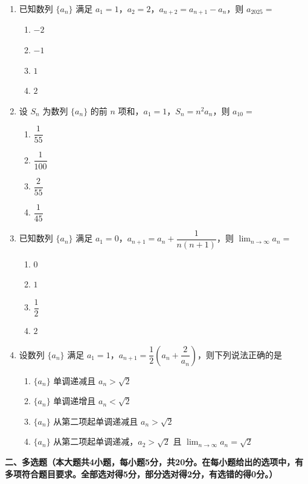 \documentclass[12pt, a4paper]{ctexart}
\newcommand{\score}[1]{\hfill\makebox[2cm][l]{(#1分)}}
\begin{document}
\begin{enumerate}
\item 已知数列 $\{a_n\}$ 满足 $a_1 = 1$，$a_2 = 2$，$a_{n+2} = a_{n+1} - a_n$，则 $a_{2025} = $\score{5}
\begin{enumerate}[label=\Alph*.]
\item $-2$
\item $-1$
\item $1$
\item $2$
\end{enumerate}

\item 设 $S_n$ 为数列 $\{a_n\}$ 的前 $n$ 项和，$a_1 = 1$，$S_n = n^2 a_n$，则 $a_{10} = $\score{5}
\begin{enumerate}[label=\Alph*.]
\item $\dfrac{1}{55}$
\item $\dfrac{1}{100}$
\item $\dfrac{2}{55}$
\item $\dfrac{1}{45}$
\end{enumerate}

\item 已知数列 $\{a_n\}$ 满足 $a_1 = 0$，$a_{n+1} = a_n + \dfrac{1}{n(n+1)}$，则 $\displaystyle\lim_{n \to \infty} a_n = $\score{5}
\begin{enumerate}[label=\Alph*.]
\item $0$
\item $1$
\item $\dfrac{1}{2}$
\item $2$
\end{enumerate}

\item 设数列 $\{a_n\}$ 满足 $a_1 = 1$，$a_{n+1} = \dfrac{1}{2}\left(a_n + \dfrac{2}{a_n}\right)$，则下列说法正确的是\score{5}
\begin{enumerate}[label=\Alph*.]
\item $\{a_n\}$ 单调递减且 $a_n > \sqrt{2}$
\item $\{a_n\}$ 单调递增且 $a_n < \sqrt{2}$
\item $\{a_n\}$ 从第二项起单调递减且 $a_n > \sqrt{2}$
\item $\{a_n\}$ 从第二项起单调递减，$a_2 > \sqrt{2}$ 且 $\displaystyle\lim_{n \to \infty} a_n = \sqrt{2}$
\end{enumerate}

\end{enumerate}

\vspace{0.5cm}

\noindent\textbf{二、多选题（本大题共4小题，每小题5分，共20分。在每小题给出的选项中，有多项符合题目要求。全部选对得5分，部分选对得2分，有选错的得0分。）}
\end{document}

